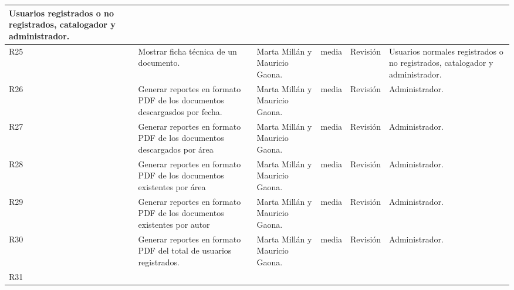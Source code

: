 \begin{center}
\begin{longtable}{|p{0.5cm}|p{3cm}|p{2cm}|p{0.8cm}|p{1.5cm}|p{2cm}|}
Usuarios  registrados o no registrados, catalogador y administrador.\\
\hline
R25
&	

Mostrar ficha técnica de un documento.
&	

Marta Millán y Mauricio Gaona.
&	

media
&	

Revisión
&	

Usuarios normales registrados o no registrados, catalogador y administrador.\\

\hline
R26
&	

Generar reportes en formato PDF de los documentos descargasdos por fecha.
&	

Marta Millán y Mauricio Gaona.
&	

media
&	

Revisión
&	

Administrador.\\
\hline
R27
	&

Generar reportes en formato PDF de los documentos descargados por área
	&

Marta Millán y Mauricio Gaona.
	&

media
	&

Revisión
	&

Administrador.\\
\hline
R28
&	

Generar reportes en formato PDF de los documentos existentes por área
&	

Marta Millán y Mauricio Gaona.
&	

media
&	

Revisión
&	

Administrador.\\
\hline
R29
&	

Generar reportes en formato PDF de los documentos existentes por autor
&	

Marta Millán y Mauricio Gaona.
&	

media
&	

Revisión
&	

Administrador.\\
\hline
R30
&	

Generar reportes en formato PDF del total de usuarios registrados.
&	

Marta Millán y Mauricio Gaona.
&	

media
&	

Revisión
&	

Administrador.\\
\hline
R31
&	


\end{longtable}
\end{center}
